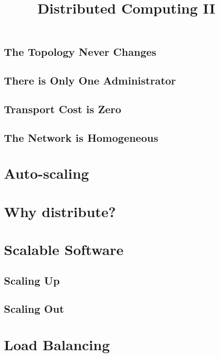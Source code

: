 \subsection{The Topology Never Changes}

\subsection{There is Only One Administrator}

\subsection{Transport Cost is Zero}

\subsection{The Network is Homogeneous}

\section{Auto-scaling}

\section{Why distribute?}

\pagebreak

\title{Distributed Computing II}
\date{}

\maketitle

\section{Scalable Software}

\subsection{Scaling Up}

\subsection{Scaling Out}

\section{Load Balancing}

